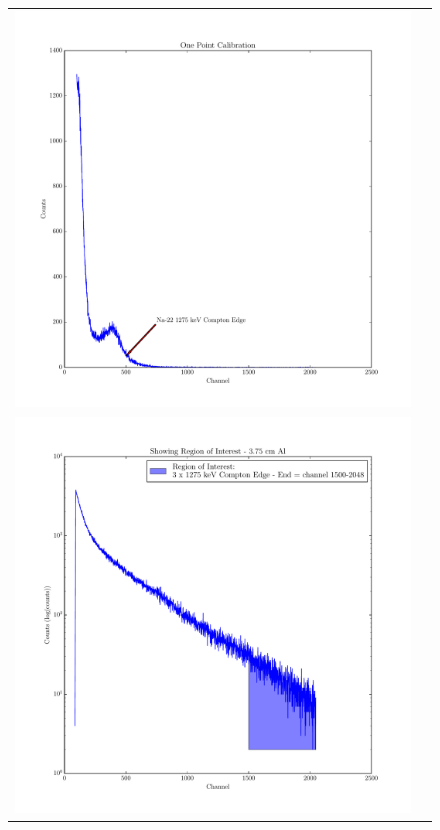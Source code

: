 \documentclass{article}
\begin{document}
  \begin{figure}[!htb]
    \centering
    \begin{tabular}{c c}
      \includegraphics[scale=.4]{../plots/na_calibration_absorber_countrates.pdf} \\ \includegraphics[scale=.4]{../plots/example_cross_section_highlight_roi.pdf}

\end{tabular}
\end{figure}
\end{document}
